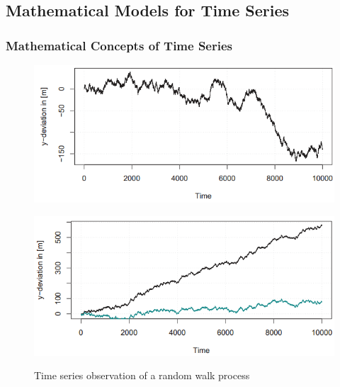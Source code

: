 \subsection{Mathematical Models for Time Series}
\subsubsection{Mathematical Concepts of Time Series}
{
	\begin{figure}[H]\centering
		\begin{minipage}[c]{0.5\textwidth}
			\includegraphics[width=1\linewidth]{images/randomWalk.png}
			\label{Fig:raWa}
		\end{minipage}\hfill
		\begin{minipage}[c]{0.5\textwidth}
			\includegraphics[width=1\linewidth]{images/randomWalkDrift.png}
			\label{Fig:raWaDrift}
		\end{minipage}
	\caption{Time series observation of a random walk process}
	\end{figure}

}
